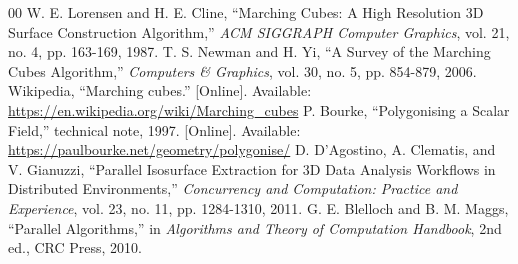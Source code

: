 \documentclass[conference]{IEEEtran}
\begin{document}
\begin{thebibliography}{00}
 W. E. Lorensen and H. E. Cline, ``Marching Cubes: A High Resolution 3D Surface Construction Algorithm,'' \textit{ACM SIGGRAPH Computer Graphics}, vol. 21, no. 4, pp. 163-169, 1987.
 T. S. Newman and H. Yi, ``A Survey of the Marching Cubes Algorithm,'' \textit{Computers \& Graphics}, vol. 30, no. 5, pp. 854-879, 2006.
 Wikipedia, ``Marching cubes.'' [Online]. Available: \url{https://en.wikipedia.org/wiki/Marching_cubes}
 P. Bourke, ``Polygonising a Scalar Field,'' technical note, 1997. [Online]. Available: \url{https://paulbourke.net/geometry/polygonise/}
 D. D'Agostino, A. Clematis, and V. Gianuzzi, ``Parallel Isosurface Extraction for 3D Data Analysis Workflows in Distributed Environments,'' \textit{Concurrency and Computation: Practice and Experience}, vol. 23, no. 11, pp. 1284-1310, 2011.
 G. E. Blelloch and B. M. Maggs, ``Parallel Algorithms,'' in \textit{Algorithms and Theory of Computation Handbook}, 2nd ed., CRC Press, 2010.
\end{thebibliography}
\end{document}

